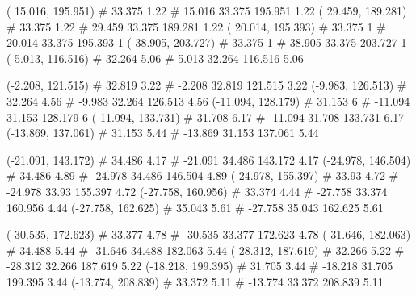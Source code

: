 \documentclass[a4paper,openbib,10pt]{article}
\newenvironment{treegraph}{\begin{graph}}{\end{graph}}
\begin{document}
\begin{treegraph}
  ( 15.016, 195.951) #     33.375    1.22
   #    15.016    33.375    195.951    1.22
  ( 29.459, 189.281) #     33.375    1.22
   #    29.459    33.375    189.281    1.22
  ( 20.014, 195.393) #     33.375    1
   #    20.014    33.375    195.393    1
  ( 38.905, 203.727) #     33.375    1
   #    38.905    33.375    203.727    1
  ( 5.013, 116.516) #     32.264    5.06
   #    5.013    32.264    116.516    5.06

  (-2.208, 121.515) #     32.819    3.22
   #    -2.208    32.819    121.515    3.22
  (-9.983, 126.513) #     32.264    4.56
   #    -9.983    32.264    126.513    4.56
  (-11.094, 128.179) #     31.153    6
   #    -11.094    31.153    128.179    6
  (-11.094, 133.731) #     31.708    6.17
   #    -11.094    31.708    133.731    6.17
  (-13.869, 137.061) #     31.153    5.44
   #    -13.869    31.153    137.061    5.44

  (-21.091, 143.172) #     34.486    4.17
   #    -21.091    34.486    143.172    4.17
  (-24.978, 146.504) #     34.486    4.89
   #    -24.978    34.486    146.504    4.89
  (-24.978, 155.397) #     33.93    4.72
   #    -24.978    33.93    155.397    4.72
  (-27.758, 160.956) #     33.374    4.44
   #    -27.758    33.374    160.956    4.44
  (-27.758, 162.625) #     35.043    5.61
   #    -27.758    35.043    162.625    5.61

  (-30.535, 172.623) #     33.377    4.78
   #    -30.535    33.377    172.623    4.78
  (-31.646, 182.063) #     34.488    5.44
   #    -31.646    34.488    182.063    5.44
  (-28.312, 187.619) #     32.266    5.22
   #    -28.312    32.266    187.619    5.22
  (-18.218, 199.395) #     31.705    3.44
   #    -18.218    31.705    199.395    3.44
  (-13.774, 208.839) #     33.372    5.11
   #    -13.774    33.372    208.839    5.11


\end{treegraph}
\end{document}

